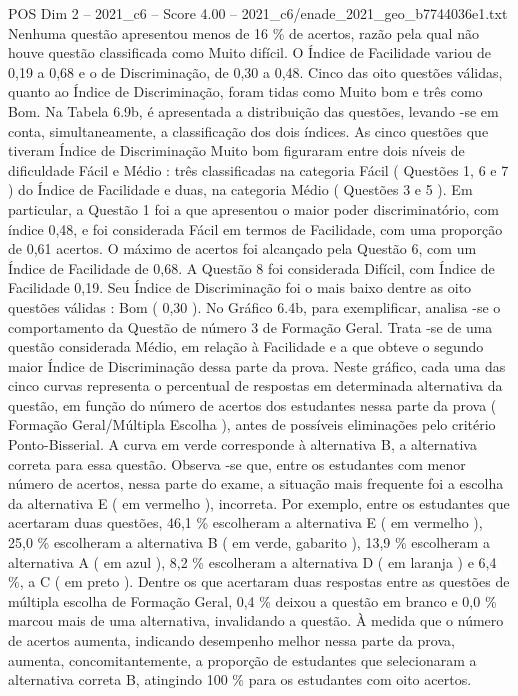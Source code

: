 \begin{textsample}{POS Dim 2 – 2021\_c6 – Score 4.00 – 2021\_c6/enade\_2021\_geo\_b7744036e1.txt}
Nenhuma questão apresentou menos de 16 \% de acertos, razão pela qual não houve questão classificada como Muito difícil.
O Índice de Facilidade variou de 0,19 a 0,68 e o de Discriminação, de 0,30 a 0,48.
Cinco das oito questões válidas, quanto ao Índice de Discriminação, foram tidas como Muito bom e três como Bom.
Na Tabela 6.9b, é apresentada a distribuição das questões, levando -se em conta, simultaneamente, a classificação dos dois índices.
As cinco questões que tiveram Índice de Discriminação Muito bom figuraram entre dois níveis de dificuldade Fácil e Médio : três classificadas na categoria Fácil ( Questões 1, 6 e 7 ) do Índice de Facilidade e duas, na categoria Médio ( Questões 3 e 5 ).
Em particular, a Questão 1 foi a que apresentou o maior poder discriminatório, com índice 0,48, e foi considerada Fácil em termos de Facilidade, com uma proporção de 0,61 acertos.
O máximo de acertos foi alcançado pela Questão 6, com um Índice de Facilidade de 0,68.
A Questão 8 foi considerada Difícil, com Índice de Facilidade 0,19.
Seu Índice de Discriminação foi o mais baixo dentre as oito questões válidas : Bom ( 0,30 ).
No Gráfico 6.4b, para exemplificar, analisa -se o comportamento da Questão de número 3 de Formação Geral.
Trata -se de uma questão considerada Médio, em relação à Facilidade e a que obteve o segundo maior Índice de Discriminação dessa parte da prova.
Neste gráfico, cada uma das cinco curvas representa o percentual de respostas em determinada alternativa da questão, em função do número de acertos dos estudantes nessa parte da prova ( Formação Geral/Múltipla Escolha ), antes de possíveis eliminações pelo critério Ponto-Bisserial.
A curva em verde corresponde à alternativa B, a alternativa correta para essa questão.
Observa -se que, entre os estudantes com menor número de acertos, nessa parte do exame, a situação mais frequente foi a escolha da alternativa E ( em vermelho ), incorreta.
Por exemplo, entre os estudantes que acertaram duas questões, 46,1 \% escolheram a alternativa E ( em vermelho ), 25,0 \% escolheram a alternativa B ( em verde, gabarito ), 13,9 \% escolheram a alternativa A ( em azul ), 8,2 \% escolheram a alternativa D ( em laranja ) e 6,4 \%, a C ( em preto ).
Dentre os que acertaram duas respostas entre as questões de múltipla escolha de Formação Geral, 0,4 \% deixou a questão em branco e 0,0 \% marcou mais de uma alternativa, invalidando a questão.
À medida que o número de acertos aumenta, indicando desempenho melhor nessa parte da prova, aumenta, concomitantemente, a proporção de estudantes que selecionaram a alternativa correta B, atingindo 100 \% para os estudantes com oito acertos.

\end{textsample}

